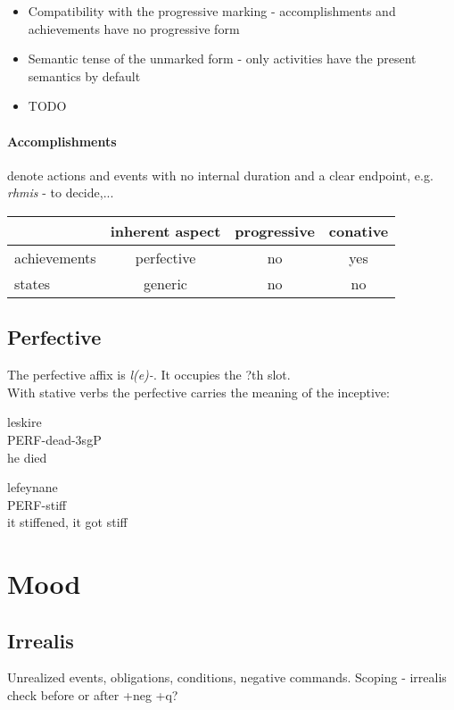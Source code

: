 \documentclass[8pt]{book}
\begin{document}
\begin{itemize}
	\item Compatibility with the progressive marking - accomplishments and achievements have no progressive form
	\item Semantic tense of the unmarked form - only activities have the present semantics by default
	\item TODO
\end{itemize}

\paragraph{Accomplishments} 
denote actions and events with no internal duration and a clear endpoint, e.g. \textit{rhmis} - to decide,...



\begin{center}
\begin{tabular}{|l|c|c|c|}
\hline
& inherent aspect & progressive & conative \\ \hline
achievements & perfective & no & yes \\ \hline
states & generic & no & no \\\hline
\end{tabular}
\end{center}

\subsection{Perfective}
The perfective affix is \textit{l(e)-}. It occupies the ?th slot.\\

With stative verbs the perfective carries the meaning of the inceptive:

\begin{exe}
	\ex \gll leskire \\
	PERF-dead-3sgP \\
	\trans he died
	
	\ex \gll lefeynane \\
	PERF-stiff \\
	\trans it stiffened, it got stiff

\end{exe}



\section{Mood}
\subsection{Irrealis}
Unrealized events, obligations, conditions, negative commands. Scoping - irrealis check before or after +neg +q?
\end{document}
